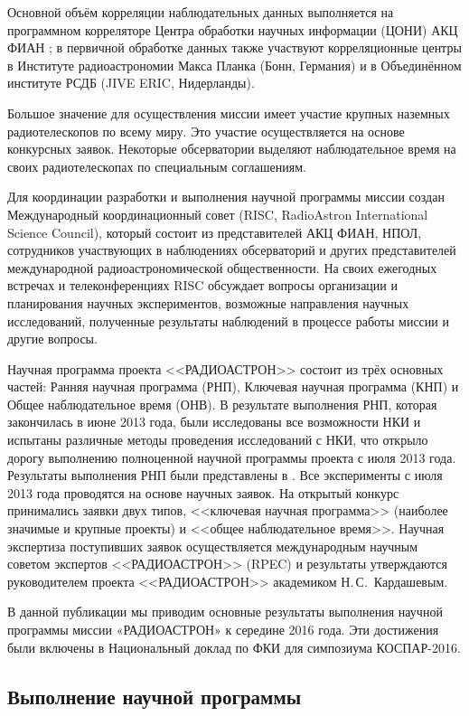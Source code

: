 Основной объём корреляции наблюдательных данных выполняется на программном корреляторе Центра
обработки научных информации (ЦОНИ) АКЦ ФИАН \cite{Andrianov_2014}; в первичной обработке данных
также участвуют корреляционные центры в Институте радиоастрономии Макса Планка (Бонн, Германия)
\cite{Bruni_2014} и в Объединённом институте РСДБ (JIVE ERIC, Нидерланды).

Большое значение для осуществления миссии имеет участие крупных наземных радиотелескопов по всему
миру. Это участие осуществляется на основе конкурсных заявок. Некоторые обсерватории выделяют
наблюдательное время на своих радиотелескопах по специальным соглашениям.

Для координации разработки и выполнения научной программы миссии создан Международный
координационный совет (RISC, RadioAstron International Science Council), который состоит из
представителей АКЦ ФИАН, НПОЛ, сотрудников участвующих в наблюдениях обсерваторий и других
представителей международной радиоастрономической общественности. На своих ежегодных встречах и
телеконференциях RISC обсуждает вопросы организации и планирования научных экспериментов, возможные
направления научных исследований, полученные результаты наблюдений в процессе работы миссии и другие
вопросы.

Научная программа проекта <<РАДИОАСТРОН>> состоит из трёх основных частей: Ранняя научная программа
(РНП), Ключевая научная программа (КНП) и Общее наблюдательное время (ОНВ). В результате выполнения
РНП, которая закончилась в июне 2013 года, были исследованы все возможности НКИ и испытаны различные
методы проведения исследований с НКИ, что открыло дорогу выполнению полноценной научной программы
проекта с июля 2013 года. Результаты выполнения РНП были представлены в \cite{Kardashev_2014}. Все
эксперименты с июля 2013 года проводятся на основе научных заявок. На открытый конкурс принимались
заявки двух типов, <<ключевая научная программа>> (наиболее значимые и крупные проекты) и <<общее
наблюдательное время>>. Научная экспертиза поступивших заявок осуществляется международным научным
советом экспертов <<РАДИОАСТРОН>> (RPEC) и результаты утверждаются руководителем проекта
<<РАДИОАСТРОН>> академиком Н.\,С.~Кардашевым.

В данной публикации мы приводим основные результаты выполнения научной программы миссии
«РАДИОАСТРОН» к середине 2016 года. Эти достижения были включены в Национальный доклад по ФКИ для
симпозиума КОСПАР-2016.

\subsection{Выполнение научной программы}

